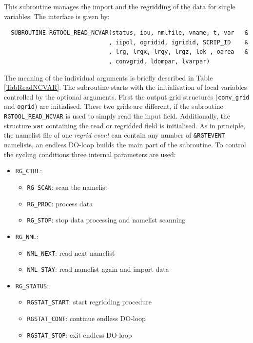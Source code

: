 \documentclass[11pt,twoside]{report}
\begin{document}
This subroutine manages the import and the regridding of the data for single
variables. The interface is given by:
\begin{verbatim}
  SUBROUTINE RGTOOL_READ_NCVAR(status, iou, nmlfile, vname, t, var   &
                              , iipol, ogridid, igridid, SCRIP_ID    &
                              , lrg, lrgx, lrgy, lrgz, lok , oarea   &
                              , convgrid, ldompar, lvarpar)
\end{verbatim}
The meaning of the individual arguments is briefly described in Table \ref{TabReadNCVAR}.
The subroutine starts with the initialisation of local variables
controlled by the optional arguments. 
First the output grid structures (\verb|conv_grid| and \verb|ogrid|)
are initialised.  
These two grids are different, if the subroutine 
\verb|RGTOOL_READ_NCVAR| is used to simply read the input field. 
Additionally, the structure \verb|var| containing the read or
 regridded field is initialised.
As in principle, the namelist file of one {\it regrid event} can contain
any number of \verb|&RGTEVENT| namelists, an endless DO-loop builds
 the main part of 
the subroutine. To control the cycling conditions three internal
 parameters are used:
\begin{itemize}
\item \verb|RG_CTRL|:  
\begin{itemize}
\item \verb|RG_SCAN|: scan the namelist
\item \verb|RG_PROC|: process data
\item \verb|RG_STOP|: stop data processing and namelist scanning
\end{itemize} 
\item \verb|RG_NML|:   
\begin{itemize}
\item \verb|NML_NEXT|: read next namelist
\item \verb|NML_STAY|: read namelist again and import data
\end{itemize} 
\item \verb|RG_STATUS|: 
\begin{itemize}
\item \verb|RGSTAT_START|: start regridding procedure
\item  \verb|RGSTAT_CONT|: continue endless DO-loop
\item \verb|RGSTAT_STOP|: exit endless DO-loop
\end{itemize} 
\end{itemize}
\end{document}
